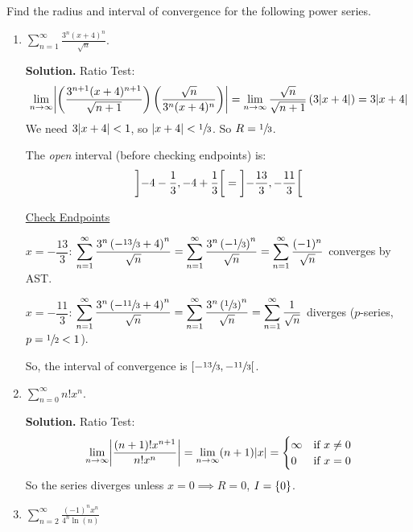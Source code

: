 \begin{Example}{}{}
    Find the radius and interval of convergence for the following power series.
    \begin{enumerate}[label=(\roman*)]
        \item $ \displaystyle \sum\limits_{n=1}^{\infty} \frac{3^n(x+4)^n}{\sqrt{n}} $.

              \textbf{Solution.} Ratio Test:
              \[ \lim\limits_{{n} \to {\infty}}
                  \abs*{\left( \frac{3^{n+1}(x+4)^{n+1}}{\sqrt{n+1}} \right)
                      \left( \frac{\sqrt{n}}{3^n(x+4)^n} \right) }
                  =\lim\limits_{{n} \to {\infty}} \frac{\sqrt{n}}{\sqrt{n+1}}\left( 3\abs{x+4} \right)
                  =3\abs{x+4} \]
              We need $ 3\lvert x+4\rvert<1 $, so $ \lvert x+4\rvert<\sfrac{1}{3} $. So $ R=\sfrac{1}{3} $.

              The \emph{open} interval (before checking endpoints) is:
              \[ \interval[open, scaled]{-4-\frac{1}{3}}{-4+\frac{1}{3}}=
                  \interval[open, scaled]{-\frac{13}{3}}{-\frac{11}{3}} \]

              \underline{Check Endpoints}

              $ x=-\dfrac{13}{3} $:
              $ \displaystyle \sum\limits_{n=1}^{\infty}
                  \frac{3^n\left( -\sfrac{13}{3}+4 \right)^n}{\sqrt{n}}
                  =\sum\limits_{n=1}^{\infty} \frac{3^n\left( -\sfrac{1}{3} \right)^n}{\sqrt{n}}
                  =\sum\limits_{n=1}^{\infty} \frac{(-1)^n}{\sqrt{n}} $ converges by AST\@.

              $ x=-\dfrac{11}{3} $:
              $ \displaystyle \sum\limits_{n=1}^{\infty}
                  \frac{3^n\left( -\sfrac{11}{3} +4 \right)^n}{\sqrt{n}}
                  =\sum\limits_{n=1}^{\infty} \frac{3^n\left( \sfrac{1}{3} \right)^n}{\sqrt{n}}
                  =\sum\limits_{n=1}^{\infty} \frac{1}{\sqrt{n}}  $ diverges
              ($ p $-series, $ p=\sfrac{1}{2}<1 $).

              So, the interval of convergence is
              $ \interval[open right, scaled]{-\sfrac{13}{3}}{-\sfrac{11}{3}} $.

        \item $ \displaystyle\sum\limits_{n=0}^{\infty} n!x^n $.

              \textbf{Solution.} Ratio Test:
              \[ \lim\limits_{{n} \to {\infty}} \abs*{\frac{(n+1)!x^{n+1}}{n!x^n} }
                  =\lim\limits_{{n} \to {\infty}} (n+1)\abs{x}=
                  \begin{cases}
                      \infty & \text{if } x\neq 0 \\
                      0      & \text{if }x=0
                  \end{cases} \]
              So the series diverges unless $ x=0\implies R=0 $, $ I=\{0\} $.
        \item $ \displaystyle \sum\limits_{n=2}^{\infty} \frac{(-1)^n x^n}{4^n\ln(n)} $


\end{enumerate}
\end{Example}
